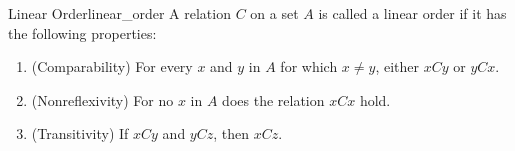 \begin{definition}
{Linear Order}{linear_order}
A relation \(C\) on a set \(A\) is called a linear order if it has the following properties:
\begin{enumerate}
    \item (Comparability) For every \(x\) and \(y\) in \(A\) for which \(x \neq y\), either \(x C y\) or \(y C x\).
    \item (Nonreflexivity) For no \(x\) in \(A\) does the relation \(x C x\) hold.
    \item (Transitivity) If \(x C y\) and \(y C z\), then \(x C z\).
\end{enumerate}
\end{definition}
